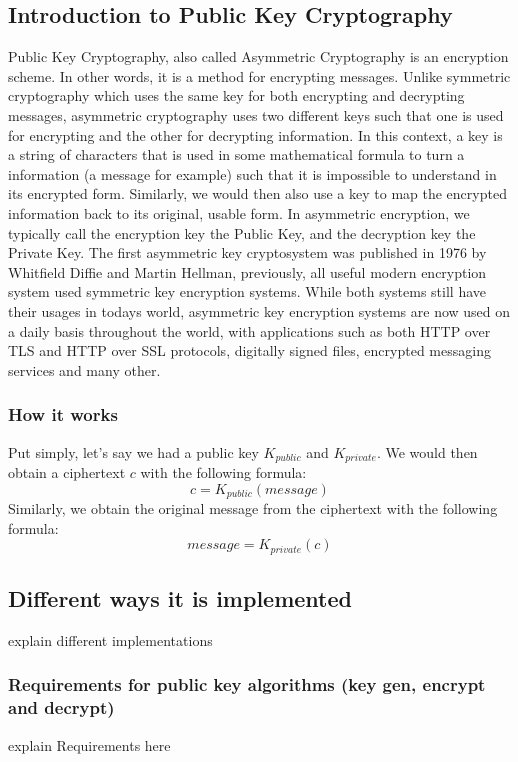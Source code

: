 \documentclass[conference]{IEEEtran}
\begin{document}
\subsection{Introduction to Public Key Cryptography}
Public Key Cryptography, also called Asymmetric Cryptography is an 
encryption scheme. In other words, it is a method for encrypting messages.
Unlike symmetric cryptography which uses the same key for both encrypting and decrypting
messages, asymmetric cryptography uses two different keys such that one 
is used for encrypting and the other for decrypting information.
In this context, a key is a string of characters that is used in some mathematical
formula to turn a information (a message for example) such that it is impossible to understand in its encrypted form. 
Similarly, we would then also use a key to map the encrypted information back to its original, usable form.
In asymmetric encryption, we typically call the encryption key
the Public Key, and the decryption key the Private Key.
The first asymmetric key cryptosystem was published in 1976 by Whitfield Diffie and Martin Hellman, previously,
all useful modern encryption system used symmetric key encryption systems. 
While both systems still have their usages in todays world,
asymmetric key encryption systems are now used on a daily basis throughout the world, with 
applications such as both HTTP over TLS and HTTP over SSL protocols, digitally signed files,
encrypted messaging services and many other. 

\subsubsection{How it works}
Put simply, let's say we had a public key $K_{public}$ and $K_{private}$.
We would then obtain a ciphertext $c$ with the following formula: 
\begin{equation*}
    c = K_{public}(message)
\end{equation*}
Similarly, we obtain the original message from the ciphertext with the following formula:
\begin{equation*}
    message = K_{private}(c)
\end{equation*}

\subsection{Different ways it is implemented}
explain different implementations

\subsubsection{Requirements for public key algorithms (key gen, encrypt and decrypt)}
explain Requirements here
\end{document}
